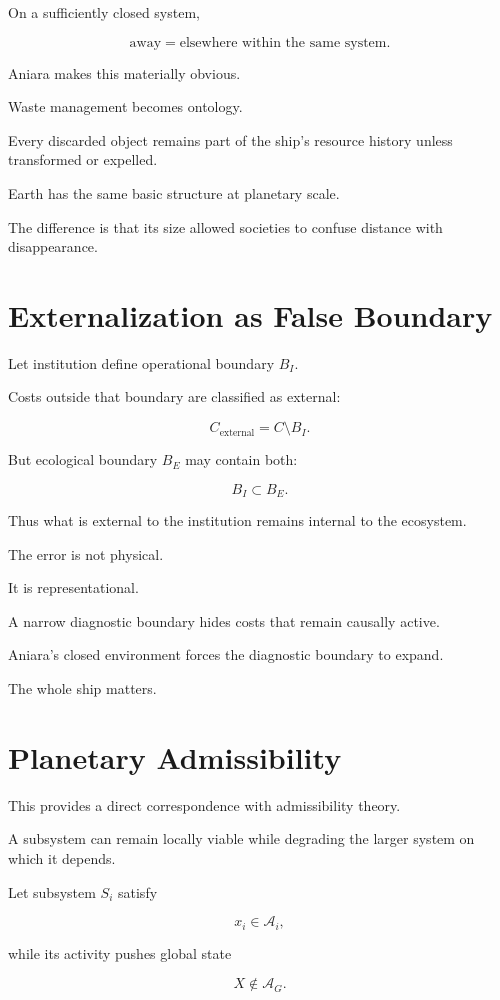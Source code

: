 \documentclass[11pt,oneside]{book}
\theoremstyle{definition}
\theoremstyle{remark}
\newcommand{\A}{\mathcal{A}}
\begin{document}
On a sufficiently closed system,

\[
\text{away}
=
\text{elsewhere within the same system}.
\]

Aniara makes this materially obvious.

Waste management becomes ontology.

Every discarded object remains part of the ship's resource history unless transformed or expelled.

Earth has the same basic structure at planetary scale.

The difference is that its size allowed societies to confuse distance with disappearance.

\section{Externalization as False Boundary}

Let institution define operational boundary \(B_I\).

Costs outside that boundary are classified as external:

\[
C_{\mathrm{external}}
=
C\setminus B_I.
\]

But ecological boundary \(B_E\) may contain both:

\[
B_I\subset B_E.
\]

Thus what is external to the institution remains internal to the ecosystem.

The error is not physical.

It is representational.

A narrow diagnostic boundary hides costs that remain causally active.

Aniara's closed environment forces the diagnostic boundary to expand.

The whole ship matters.

\section{Planetary Admissibility}

This provides a direct correspondence with admissibility theory.

A subsystem can remain locally viable while degrading the larger system on which it depends.

Let subsystem \(S_i\) satisfy

\[
x_i\in\A_i,
\]

while its activity pushes global state

\[
X\notin\A_G.
\]
\end{document}
